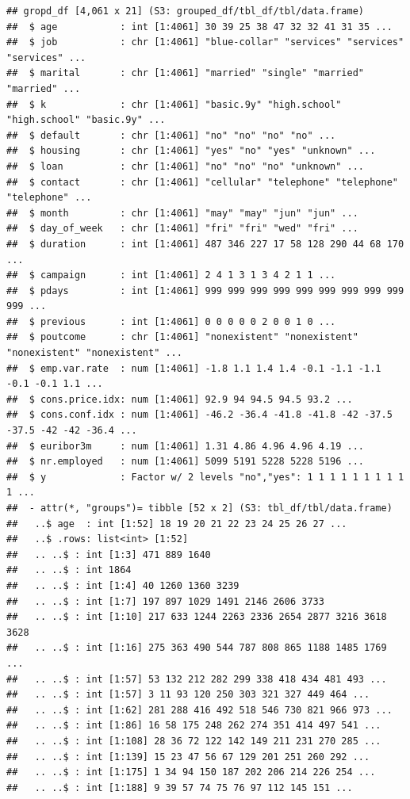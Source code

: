 \documentclass[
]{article}
\begin{document}
\begin{verbatim}
## gropd_df [4,061 x 21] (S3: grouped_df/tbl_df/tbl/data.frame)
##  $ age           : int [1:4061] 30 39 25 38 47 32 32 41 31 35 ...
##  $ job           : chr [1:4061] "blue-collar" "services" "services" "services" ...
##  $ marital       : chr [1:4061] "married" "single" "married" "married" ...
##  $ k             : chr [1:4061] "basic.9y" "high.school" "high.school" "basic.9y" ...
##  $ default       : chr [1:4061] "no" "no" "no" "no" ...
##  $ housing       : chr [1:4061] "yes" "no" "yes" "unknown" ...
##  $ loan          : chr [1:4061] "no" "no" "no" "unknown" ...
##  $ contact       : chr [1:4061] "cellular" "telephone" "telephone" "telephone" ...
##  $ month         : chr [1:4061] "may" "may" "jun" "jun" ...
##  $ day_of_week   : chr [1:4061] "fri" "fri" "wed" "fri" ...
##  $ duration      : int [1:4061] 487 346 227 17 58 128 290 44 68 170 ...
##  $ campaign      : int [1:4061] 2 4 1 3 1 3 4 2 1 1 ...
##  $ pdays         : int [1:4061] 999 999 999 999 999 999 999 999 999 999 ...
##  $ previous      : int [1:4061] 0 0 0 0 0 2 0 0 1 0 ...
##  $ poutcome      : chr [1:4061] "nonexistent" "nonexistent" "nonexistent" "nonexistent" ...
##  $ emp.var.rate  : num [1:4061] -1.8 1.1 1.4 1.4 -0.1 -1.1 -1.1 -0.1 -0.1 1.1 ...
##  $ cons.price.idx: num [1:4061] 92.9 94 94.5 94.5 93.2 ...
##  $ cons.conf.idx : num [1:4061] -46.2 -36.4 -41.8 -41.8 -42 -37.5 -37.5 -42 -42 -36.4 ...
##  $ euribor3m     : num [1:4061] 1.31 4.86 4.96 4.96 4.19 ...
##  $ nr.employed   : num [1:4061] 5099 5191 5228 5228 5196 ...
##  $ y             : Factor w/ 2 levels "no","yes": 1 1 1 1 1 1 1 1 1 1 ...
##  - attr(*, "groups")= tibble [52 x 2] (S3: tbl_df/tbl/data.frame)
##   ..$ age  : int [1:52] 18 19 20 21 22 23 24 25 26 27 ...
##   ..$ .rows: list<int> [1:52] 
##   .. ..$ : int [1:3] 471 889 1640
##   .. ..$ : int 1864
##   .. ..$ : int [1:4] 40 1260 1360 3239
##   .. ..$ : int [1:7] 197 897 1029 1491 2146 2606 3733
##   .. ..$ : int [1:10] 217 633 1244 2263 2336 2654 2877 3216 3618 3628
##   .. ..$ : int [1:16] 275 363 490 544 787 808 865 1188 1485 1769 ...
##   .. ..$ : int [1:57] 53 132 212 282 299 338 418 434 481 493 ...
##   .. ..$ : int [1:57] 3 11 93 120 250 303 321 327 449 464 ...
##   .. ..$ : int [1:62] 281 288 416 492 518 546 730 821 966 973 ...
##   .. ..$ : int [1:86] 16 58 175 248 262 274 351 414 497 541 ...
##   .. ..$ : int [1:108] 28 36 72 122 142 149 211 231 270 285 ...
##   .. ..$ : int [1:139] 15 23 47 56 67 129 201 251 260 292 ...
##   .. ..$ : int [1:175] 1 34 94 150 187 202 206 214 226 254 ...
##   .. ..$ : int [1:188] 9 39 57 74 75 76 97 112 145 151 ...

\end{verbatim}
\end{document}

